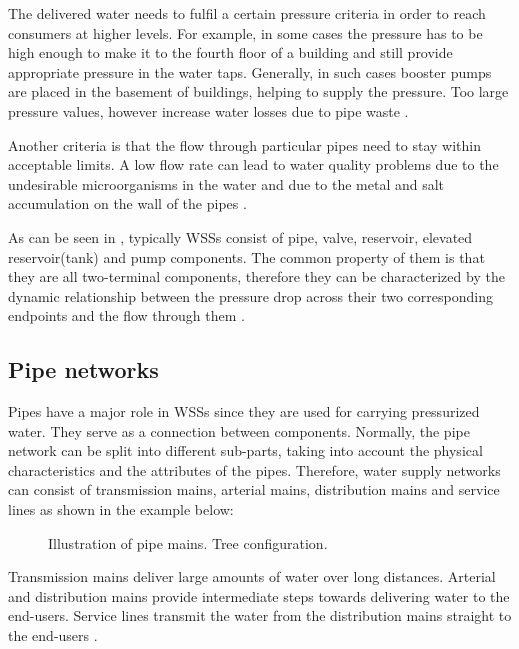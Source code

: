 The delivered water needs to fulfil a certain pressure criteria in order to reach consumers at higher levels. For example, in some cases the pressure has to be high enough to make it to the fourth floor of a building and still provide appropriate pressure in the water taps. Generally, in such cases booster pumps are placed in the basement of buildings, helping to supply the pressure. Too large pressure values, however increase water losses due to pipe waste \cite{walski2003advanced}.

Another criteria is that the flow through particular pipes need to stay within acceptable limits. A low flow rate can lead to water quality problems due to the undesirable microorganisms in the water and due to the metal and salt accumulation on the wall of the pipes \cite{walski2003advanced}. 

As can be seen in , typically WSSs consist of pipe, valve, reservoir, elevated reservoir(tank) and pump components. The common property of them is that they are all two-terminal components, therefore they can be characterized by the dynamic relationship between the pressure drop across their two corresponding endpoints and the flow through them \cite{master_aau}. 

\subsection{Pipe networks}
\label{pipe_networks}

Pipes have a major role in WSSs since they are used for carrying pressurized water. They serve as a connection between components. Normally, the pipe network can be split into different sub-parts, taking into account the physical characteristics and the attributes of the pipes. Therefore, water supply networks can consist of transmission mains, arterial mains, distribution mains and service lines as shown in the example below: 

\begin{figure}[H]
\centering
 
\caption{Illustration of pipe mains. Tree configuration.}
\label{fig:pipemain_example}
\end{figure}

Transmission mains deliver large amounts of water over long distances. Arterial and distribution mains provide intermediate steps towards delivering water to the end-users. Service lines transmit the water from the distribution mains straight to the end-users \cite{grigg2012water}.

